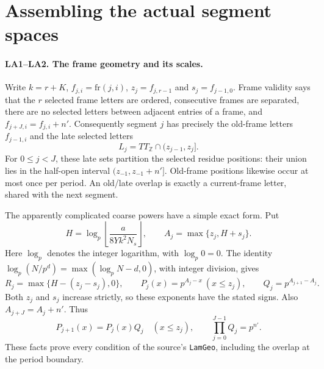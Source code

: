 \section{Assembling the actual segment spaces}
\label{sec:segment-assembly}


\paragraph{LA1--LA2. The frame geometry and its scales.}
Write $k=r+K$, $f_{j,i}=\mathrm{fr}(j,i)$, $z_j=f_{j,r-1}$ and $s_j=f_{j-1,0}$.
Frame validity says that the $r$ selected frame letters are ordered, consecutive frames are separated, there are no selected letters between adjacent entries of a frame, and
$f_{j+J,i}=f_{j,i}+n'$.
Consequently segment $j$ has precisely the old-frame letters $f_{j-1,i}$ and the late selected letters
\[
 L_j=TT_{\mathbb Z}\cap(z_{j-1},z_j].
\]
For $0\le j<J$, these late sets partition the selected residue positions: their union lies in the half-open interval $(z_{-1},z_{-1}+n']$.
Old-frame positions likewise occur at most once per period. An old/late overlap is exactly a current-frame letter, shared with the next segment.

The apparently complicated coarse powers have a simple exact form. Put
\[
 H=\log_p\left\lfloor\frac{a}{8Yk^2N_s}\right\rfloor,
 \qquad A_j=\max\{z_j,H+s_j\}.
\]
Here $\log_p$ denotes the integer logarithm, with $\log_p0=0$.
The identity $\log_p(N/p^d)=\max(\log_pN-d,0)$, with integer division, gives
\[
 R_j=\max\{H-(z_j-s_j),0\},\qquad
 P_j(x)=p^{A_j-x}\ (x\le z_j),\qquad Q_j=p^{A_{j+1}-A_j}. \tag{LA.1}
\]
Both $z_j$ and $s_j$ increase strictly, so these exponents have the stated signs.
Also $A_{j+J}=A_j+n'$. Thus
\[
 P_{j+1}(x)=P_j(x)Q_j\quad(x\le z_j),
 \qquad \prod_{j=0}^{J-1}Q_j=p^{n'}. \tag{LA.2}
\]
These facts prove every condition of the source's \texttt{LamGeo}, including the overlap at the period boundary.

